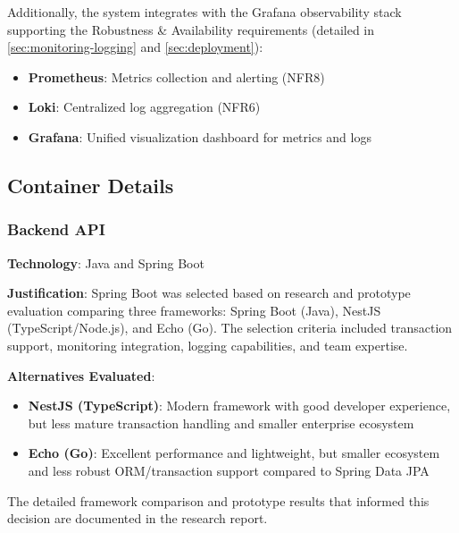 Additionally, the system integrates with the Grafana observability stack supporting the Robustness \& Availability requirements (detailed in \cref{sec:monitoring-logging} and \cref{sec:deployment}):

\begin{itemize}
    \item \textbf{Prometheus}: Metrics collection and alerting (NFR8)
    \item \textbf{Loki}: Centralized log aggregation (NFR6)
    \item \textbf{Grafana}: Unified visualization dashboard for metrics and logs
\end{itemize}

\subsection{Container Details}

\subsubsection{Backend API}
\textbf{Technology}: Java and Spring Boot

\textbf{Justification}:
Spring Boot was selected based on research and prototype evaluation comparing three frameworks: Spring Boot (Java), NestJS (TypeScript/Node.js), and Echo (Go). The selection criteria included transaction support, monitoring integration, logging capabilities, and team expertise.

\textbf{Alternatives Evaluated}:
\begin{itemize}
    \item \textbf{NestJS (TypeScript)}: Modern framework with good developer experience, but less mature transaction handling and smaller enterprise ecosystem
    \item \textbf{Echo (Go)}: Excellent performance and lightweight, but smaller ecosystem and less robust ORM/transaction support compared to Spring Data JPA
\end{itemize}

The detailed framework comparison and prototype results that informed this decision are documented in the research report.

